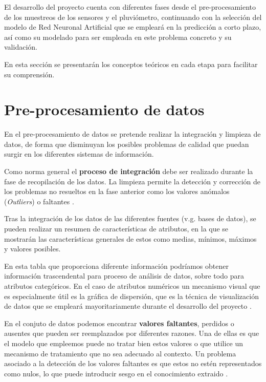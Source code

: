 El desarrollo del proyecto cuenta con diferentes fases desde el pre-procesamiento de los muestreos de los sensores y el pluviómetro,
continuando con la selección del modelo de Red Neuronal Artificial que se empleará en la predicción a corto plazo, así como su 
modelado para ser empleada en este problema concreto y su validación.

En esta sección se presentarán los conceptos teóricos en cada etapa para facilitar su comprensión.

\section{Pre-procesamiento de datos}
En el pre-procesamiento de datos se pretende realizar la integración y limpieza de datos, de forma que disminuyan los posibles problemas
de calidad que puedan surgir en los diferentes sistemas de información.

Como norma general el \textbf{proceso de integración} debe ser realizado durante la fase de recopilación de los datos.
La limpieza permite la detección y corrección de los problemas no resueltos en la fase anterior como los valores anómalos (\textit{Outliers}) o faltantes 
\cite{book:hernandez2004}.  

Tras la integración de los datos de las diferentes fuentes (v.g. bases de datos), se pueden realizar un resumen de características de atributos, en la que
se mostrarán las características generales de estos como medias, mínimos, máximos y valores posibles. 

En esta tabla que proporciona diferente información podríamos obtener información trascendental para proceso de análisis de datos, sobre todo para atributos categóricos.
En el caso de atributos numéricos un mecanismo visual que es especialmente útil es la gráfica de dispersión, que es la técnica de visualización
de datos que se empleará mayoritariamente durante el desarrollo del proyecto \cite{book:hernandez2004}.

En el conjuto de datos podemos encontrar \textbf{valores faltantes}, perdidos o ausentes que pueden ser reemplazados por diferentes razones. Una de ellas es que
el modelo que empleemos puede no tratar bien estos valores o que utilice un mecanismo de tratamiento que no sea adecuado al contexto.
Un problema asociado a la detección de los valores faltantes es que estos no estén representados como nulos, lo que puede introducir sesgo en el conocimiento
extraido \cite{book:hernandez2004}.

